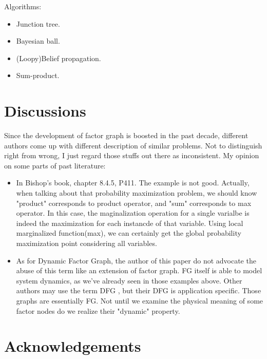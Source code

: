 Algorithms:
\begin{itemize}
	\item Junction tree. 
	\item Bayesian ball. 
	\item (Loopy)Belief propagation. 
	\item Sum-product. 
\end{itemize}

\section{Discussions}

Since the development of factor graph is boosted in the past decade, 
different authors come up with different description of similar problems. 
Not to distinguish right from wrong, I just regard those stuffs out there
as inconsistent. My opinion on some parts of past literature:
\begin{itemize}
	\item In Bishop's book\cite{bishop2006pattern}, chapter 8.4.5, P411. 
	The example is not good. Actually, when talking about that probability 
	maximization problem, we should know "product" corresponds to product operator, 
	and "sum" corresponds to max operator. In this case, the maginalization 
	operation for a single varialbe is indeed the maximization for each 
	instancde of that variable. Using local marginalized function(max), we 
	can certainly get the global probability maximization point considering
	all variables. 
	\item As for Dynamic Factor Graph, the author of this paper do not advocate 
	the abuse of this term like an extension of factor graph. FG itself is able 
	to model system dynamics, as we've already seen in those examples above. 
	Other authors may use the term DFG
\cite{wang2011-dynamic}
\cite{mirowski2009dynamic}
	, but their DFG is application specific. 
	Those graphs are essentially FG. Not until we examine the physical meaning of 
	some factor nodes do we realize their "dynamic" property. 
\end{itemize}

\section*{Acknowledgements}



